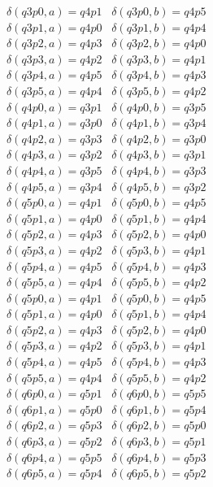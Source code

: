 \documentclass[a4paper]{article}
\begin{document}
\begin{enumerate}
$\delta(q3p0, a) = q4p1$ \  $\delta(q3p0, b) = q4p5$ \\
$\delta(q3p1, a) = q4p0$ \  $\delta(q3p1, b) = q4p4$ \\
$\delta(q3p2, a) = q4p3$ \  $\delta(q3p2, b) = q4p0$ \\
$\delta(q3p3, a) = q4p2$ \  $\delta(q3p3, b) = q4p1$ \\
$\delta(q3p4, a) = q4p5$ \  $\delta(q3p4, b) = q4p3$ \\
$\delta(q3p5, a) = q4p4$ \  $\delta(q3p5, b) = q4p2$ \\

$\delta(q4p0, a) = q3p1$ \  $\delta(q4p0, b) = q3p5$ \\
$\delta(q4p1, a) = q3p0$ \  $\delta(q4p1, b) = q3p4$ \\
$\delta(q4p2, a) = q3p3$ \  $\delta(q4p2, b) = q3p0$ \\
$\delta(q4p3, a) = q3p2$ \  $\delta(q4p3, b) = q3p1$ \\
$\delta(q4p4, a) = q3p5$ \  $\delta(q4p4, b) = q3p3$ \\
$\delta(q4p5, a) = q3p4$ \  $\delta(q4p5, b) = q3p2$ \\

$\delta(q5p0, a) = q4p1$ \  $\delta(q5p0, b) = q4p5$ \\
$\delta(q5p1, a) = q4p0$ \  $\delta(q5p1, b) = q4p4$ \\
$\delta(q5p2, a) = q4p3$ \  $\delta(q5p2, b) = q4p0$ \\
$\delta(q5p3, a) = q4p2$ \  $\delta(q5p3, b) = q4p1$ \\
$\delta(q5p4, a) = q4p5$ \  $\delta(q5p4, b) = q4p3$ \\
$\delta(q5p5, a) = q4p4$ \  $\delta(q5p5, b) = q4p2$ \\

$\delta(q5p0, a) = q4p1$ \  $\delta(q5p0, b) = q4p5$ \\
$\delta(q5p1, a) = q4p0$ \  $\delta(q5p1, b) = q4p4$ \\
$\delta(q5p2, a) = q4p3$ \  $\delta(q5p2, b) = q4p0$ \\
$\delta(q5p3, a) = q4p2$ \  $\delta(q5p3, b) = q4p1$ \\
$\delta(q5p4, a) = q4p5$ \  $\delta(q5p4, b) = q4p3$ \\
$\delta(q5p5, a) = q4p4$ \  $\delta(q5p5, b) = q4p2$ \\

$\delta(q6p0, a) = q5p1$ \  $\delta(q6p0, b) = q5p5$ \\
$\delta(q6p1, a) = q5p0$ \  $\delta(q6p1, b) = q5p4$ \\
$\delta(q6p2, a) = q5p3$ \  $\delta(q6p2, b) = q5p0$ \\
$\delta(q6p3, a) = q5p2$ \  $\delta(q6p3, b) = q5p1$ \\
$\delta(q6p4, a) = q5p5$ \  $\delta(q6p4, b) = q5p3$ \\
$\delta(q6p5, a) = q5p4$ \  $\delta(q6p5, b) = q5p2$ \\


\end{enumerate}
\end{document}
